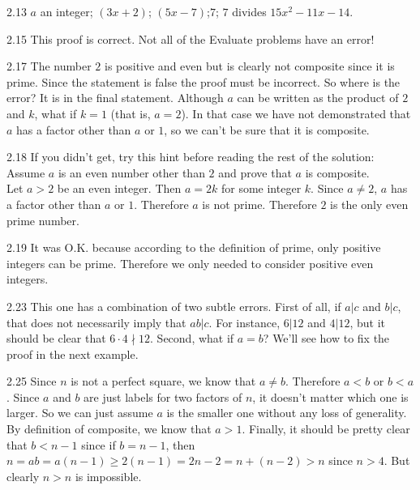 \begin{Answer}{2.13}
$a$ an integer; $(3x + 2)$; $(5x - 7)$;$7$; $7$ divides $15x^2 - 11x - 14$.
\end{Answer}
\begin{Answer}{2.15}
This proof is correct.  Not all of the Evaluate problems have an error!
\end{Answer}
\begin{Answer}{2.17}
The number $2$ is positive and even but is clearly not composite since it is prime.
Since the statement is false the proof must be incorrect.
So where is the error?  It is in the final statement.  Although $a$ can be written
as the product of $2$ and $k$, what if $k=1$ (that is, $a=2$).  In that case
we have not demonstrated that $a$ has a factor other than $a$ or $1$, so we can't be sure
that it is composite.
\end{Answer}
\begin{Answer}{2.18}
If you didn't get, try this hint before reading the rest of the solution:
 Assume $a$ is an even number other than $2$ and prove that $a$ is composite.\\
Let $a>2$ be an even integer.  Then $a=2k$ for some integer $k$.  Since $a\neq 2$,
$a$ has a factor other than $a$ or $1$.  Therefore $a$ is not prime.
Therefore $2$ is the only even prime number.
\end{Answer}
\begin{Answer}{2.19}
It was O.K. because according to the definition of prime, only positive integers can be prime.
Therefore we only needed to consider positive even integers.
\end{Answer}
\begin{Answer}{2.23}
This one has a combination of two subtle errors.
First of all, if $a|c$ and $b|c$, that does not necessarily imply that $ab|c$.
For instance, $6|12$ and $4|12$, but it should be clear that $6\cdot 4\nmid 12$.
Second, what if $a=b$?
We'll see how to fix the proof in the next example.
\end{Answer}
\begin{Answer}{2.25}
Since $n$ is not a perfect square, we know that $a\neq b$.
Therefore  $a<b$ or $b<a$.  Since $a$ and $b$ are just labels for
two factors of $n$, it doesn't matter which one is larger.  So we can
just assume $a$ is the smaller one without any loss of generality.
By definition of composite, we know that $a>1$.
Finally, it should be pretty clear that $b<n-1$ since if $b=n-1$, then
$n=ab=a(n-1)\geq 2(n-1)=2n-2=n+(n-2)>n$ since $n>4$. But clearly $n>n$ is impossible.
\end{Answer}

